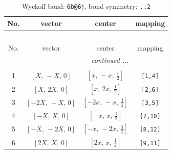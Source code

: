 \documentclass[fleqn,8pt]{jsarticle}
\begin{document}
\begin{longtable}{cccc}
\caption{Wyckoff bond: {\tt 6b@6j}, bond symmetry: {\tt ..2}}
 \\
 \hline \hline
No. & vector & center & mapping \\ \hline \endfirsthead

\multicolumn{3}{l}{\tablename\ \thetable{}} \\
 \hline \hline
No. & vector & center & mapping \\ \hline \endhead

 \hline \hline
\multicolumn{3}{r}{\footnotesize\it continued ...} \\ \endfoot

 \hline \hline
\multicolumn{3}{r}{} \\ \endlastfoot

1 & $\left[ X,\, - X,\, 0 \right]$ & $\left[ x,\, - x,\, \frac{1}{2} \right]$ & {\tt [1,4]} \\ \hline
2 & $\left[ X,\, 2 X,\, 0 \right]$ & $\left[ x,\, 2 x,\, \frac{1}{2} \right]$ & {\tt [2,6]} \\ \hline
3 & $\left[ - 2 X,\, - X,\, 0 \right]$ & $\left[ - 2 x,\, - x,\, \frac{1}{2} \right]$ & {\tt [3,5]} \\ \hline
4 & $\left[ - X,\, X,\, 0 \right]$ & $\left[ - x,\, x,\, \frac{1}{2} \right]$ & {\tt [7,10]} \\ \hline
5 & $\left[ - X,\, - 2 X,\, 0 \right]$ & $\left[ - x,\, - 2 x,\, \frac{1}{2} \right]$ & {\tt [8,12]} \\ \hline
6 & $\left[ 2 X,\, X,\, 0 \right]$ & $\left[ 2 x,\, x,\, \frac{1}{2} \right]$ & {\tt [9,11]} \\
\end{longtable}
\renewcommand{\arraystretch}{1.2}
\end{document}
